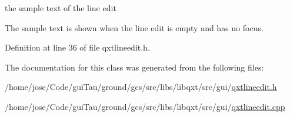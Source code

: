 the sample text of the line edit 

The sample text is shown when the line edit is empty and has no focus. 

Definition at line 36 of file qxtlineedit.\-h.



The documentation for this class was generated from the following files\-:\begin{DoxyCompactItemize}
\item 
/home/jose/\-Code/gui\-Tau/ground/gcs/src/libs/libqxt/src/gui/\hyperlink{qxtlineedit_8h}{qxtlineedit.\-h}\item 
/home/jose/\-Code/gui\-Tau/ground/gcs/src/libs/libqxt/src/gui/\hyperlink{qxtlineedit_8cpp}{qxtlineedit.\-cpp}\end{DoxyCompactItemize}
